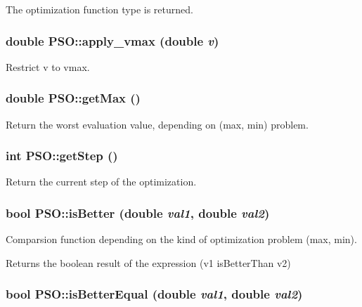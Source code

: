The optimization function type is returned. 

\hypertarget{classPSO_3ff735011be4811df1ab4d4366f84190}{
\subsubsection{\setlength{\rightskip}{0pt plus 5cm}double PSO::apply\_\-vmax (double {\em v})}}
\label{classPSO_3ff735011be4811df1ab4d4366f84190}


Restrict v to vmax. 

\hypertarget{classPSO_e6edebe0b4bb447c95b9ec8c4846daa0}{
\subsubsection{\setlength{\rightskip}{0pt plus 5cm}double PSO::getMax ()}}
\label{classPSO_e6edebe0b4bb447c95b9ec8c4846daa0}


Return the worst evaluation value, depending on (max, min) problem. 

\hypertarget{classPSO_134b1281d2b1216a2090217c21aff309}{
\subsubsection{\setlength{\rightskip}{0pt plus 5cm}int PSO::getStep ()}}
\label{classPSO_134b1281d2b1216a2090217c21aff309}


Return the current step of the optimization. 

\hypertarget{classPSO_9a41fda12a9a5a81b97fc5183620f77b}{
\subsubsection{\setlength{\rightskip}{0pt plus 5cm}bool PSO::isBetter (double {\em val1}, \/  double {\em val2})}}
\label{classPSO_9a41fda12a9a5a81b97fc5183620f77b}


Comparsion function depending on the kind of optimization problem (max, min). 

Returns the boolean result of the expression (v1 isBetterThan v2) \hypertarget{classPSO_d1599ea09344d65e4aaa533edafebd39}{
\subsubsection{\setlength{\rightskip}{0pt plus 5cm}bool PSO::isBetterEqual (double {\em val1}, \/  double {\em val2})}}
\label{classPSO_d1599ea09344d65e4aaa533edafebd39}


